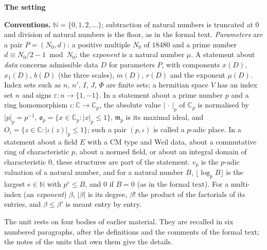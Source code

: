 \documentclass[11pt,a4paper]{article}
\newcommand{\sect}[2]{\refstepcounter{section}\label{#2}\par\addvspace{19pt plus 4pt minus 2pt}\Needspace{7\baselineskip}%
  \noindent\llap{{\fontsize{13.2}{16}\selectfont\bfseries\color{inkfaint}\thesection}\hspace{9pt}}%
  {\fontsize{13.2}{16}\selectfont\bfseries\color{ink}#1}\par\nopagebreak\vspace{-1pt}}
\theoremstyle{plainx}
\theoremstyle{uprightx}
\newenvironment{conventions}{\par\addvspace{5pt}\noindent\textbf{Conventions.}\enspace\ignorespaces}{\par\addvspace{3pt}}
\newcommand{\CC}{\mathbb{C}}
\newcommand{\NN}{\mathbb{N}}
\newcommand{\Cp}{\CC_p}
\newcommand{\op}{\mathfrak{o}_p}
\newcommand{\mxp}{\mathfrak{m}_p}
\newcommand{\Oj}{O_\iota}
\newcommand{\np}[1]{|#1|_p}
\newcommand{\muD}[1]{\mu(#1)}
\newcommand{\xD}[1]{x(#1)}
\newcommand{\xoD}[1]{x_1(#1)}
\newcommand{\bD}[1]{b(#1)}
\newcommand{\mD}[1]{m(#1)}
\newcommand{\rD}[1]{r(#1)}
\begin{document}
\sect{The setting}{s:setting}
\begin{conventions}\label{c:conventions}
$\NN=\{0,1,2,\dots\}$; subtraction of natural numbers is truncated at $0$ and division of natural numbers is the
floor, as in the formal text. \emph{Parameters} are a pair $P=(N_0,d)$: a positive multiple $N_0$ of $18480$ and a
prime number $d\equiv N_0/2-1\bmod N_0$; the \emph{exponent} is a natural number $\mu$. A statement about
\emph{data} concerns admissible data $D$ for parameters $P$, with components $\xD{D}$, $\xoD{D}$, $\bD{D}$ (the three scales),
$\mD{D}$, $\rD{D}$ and the exponent $\muD{D}$. Index sets such as $n$, $n'$, $I$, $J$, $\Phi$ are finite sets; a hermitian
space $V$ has an index set $n$ and signs $\varepsilon\colon n\to\{1,-1\}$. In a statement about a prime number
$p$ and a ring homomorphism $\iota\colon\CC\to\Cp$, the absolute value $\np{\,\cdot\,}$ of $\Cp$ is normalised by
$\np{p}=p^{-1}$, $\op=\{x\in\Cp:\np{x}\le1\}$, $\mxp$ is its maximal ideal, and $\Oj=\{z\in\CC:\np{\iota(z)}\le1\}$;
such a pair $(p,\iota)$ is called a $p$-adic place. In a statement about a field $E$ with a CM type and Weil data,
about a commutative ring of characteristic $p$, about a normed field, or about an integral domain of
characteristic $0$, these structures are part of the statement. $v_p$ is the $p$-adic valuation of a natural
number, and for a natural number $B$, $\lfloor\log_pB\rfloor$ is the largest $e\in\NN$ with $p^e\le B$, and $0$
if $B=0$ (as in the formal text). For a multi-index (an \emph{exponent}) $\beta$, $|\beta|$ is its degree, $\beta!$ the product of the
factorials of its entries, and $\beta\le\beta'$ is meant entry by entry.
\end{conventions}

The unit rests on four bodies of earlier material. They are recalled in six numbered paragraphs, after the
definitions and the comments of the formal text; the notes of the units that own them give the details.
\end{document}
